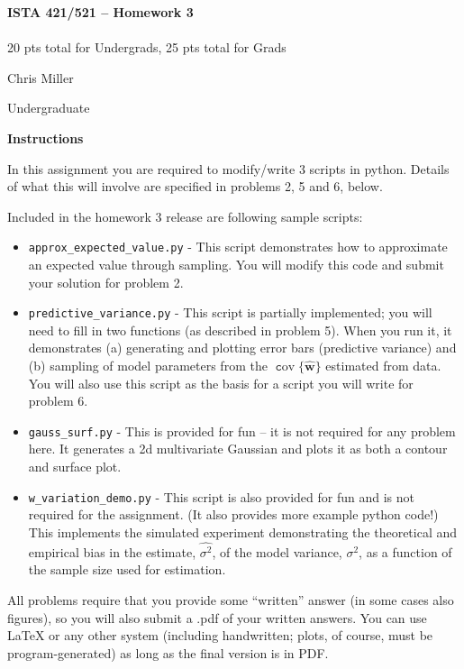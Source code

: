 \documentclass[10pt]{article}
\newcommand{\latex}{\LaTeX\xspace}
\DeclareMathOperator{\cov}{\texttt cov}
\begin{document}
\begin{center}
    {\Large {\bf ISTA 421/521 -- Homework 3}} \\
     \\
    20 pts total for Undergrads, 25 pts total for Grads
    
\end{center}

\begin{flushright}
Chris Miller %

Undergraduate %
\end{flushright}

\vspace{1cm}
{\Large {\bf Instructions}}

In this assignment you are required to modify/write 3 scripts in python.  Details of what this will involve are specified in problems 2, 5 and 6, below.

Included in the homework 3 release are following sample scripts:
\begin{itemize}
\item {\tt approx\_expected\_value.py} - This script demonstrates how to approximate an expected value through sampling.  You will modify this code and submit your solution for problem 2.
\item {\tt predictive\_variance.py} - This script is partially implemented; you will need to fill in two functions (as described in problem 5).  When you run it, it demonstrates (a) generating and plotting error bars (predictive variance) and (b) sampling of model parameters from the $\cov\{\widehat{\mathbf{w}}\}$ estimated from data.  You will also use this script as the basis for a script you will write for problem 6.
\item {\tt gauss\_surf.py} - This is provided for fun -- it is not required for any problem here.  It generates a 2d multivariate Gaussian and plots it as both a contour and surface plot.
\item {\tt w\_variation\_demo.py} - This script is also provided for fun and is not required for the assignment. (It also provides more example python code!)  This implements the simulated experiment demonstrating the theoretical and empirical bias in the estimate, $\widehat{\sigma^2}$, of the model variance, $\sigma^2$, as a function of the sample size used for estimation.
\end{itemize}

All problems require that you provide some ``written'' answer (in some cases also figures), so you will also submit a .pdf of your written answers.  You can use \latex or any other system (including handwritten; plots, of course, must be program-generated) as long as the final version is in PDF.
\end{document}
